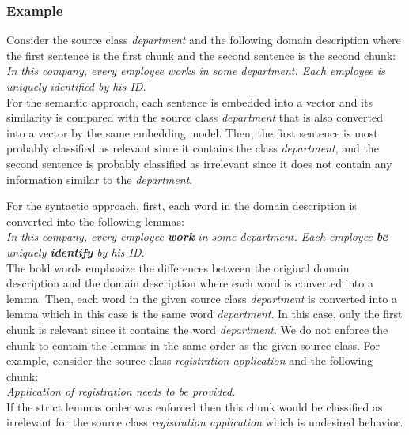 \subsubsection{Example}

Consider the source class \textit{department} and the following domain description where the first sentence is the first chunk and the second sentence is the second chunk: \\

\noindent{}\textit{In this company, every employee works in some department. Each employee is uniquely identified by his ID.} \\

For the semantic approach, each sentence is embedded into a vector and its similarity is compared with the source class \textit{department} that is also converted into a vector by the same embedding model. Then, the first sentence is most probably classified as relevant since it contains the class \textit{department}, and the second sentence is probably classified as irrelevant since it does not contain any information similar to the \textit{department}.

For the syntactic approach, first, each word in the domain description is converted into the following lemmas: \\

\noindent{}\textit{In this company, every employee \textbf{work} in some department. Each employee \textbf{be} uniquely \textbf{identify} by his ID.} \\

\noindent{}The bold words emphasize the differences between the original domain description and the domain description where each word is converted into a lemma. Then, each word in the given source class \textit{department} is converted into a lemma which in this case is the same word \textit{department}.  In this case, only the first chunk is relevant since it contains the word \textit{department}. We do not enforce the chunk to contain the lemmas in the same order as the given source class. For example, consider the source class \textit{registration application} and the following chunk: \\

\noindent{}\textit{Application of registration needs to be provided.} \\

\noindent{}If the strict lemmas order was enforced then this chunk would be classified as irrelevant for the source class \textit{registration application} which is undesired behavior.



